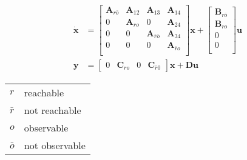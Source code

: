 \begin{align*}
    \dot{\mathbf{x}} & = \begin{bmatrix}
                             \mathbf{A}_{r\bar{o}} & \mathbf{A}_{12} & \mathbf{A}_{13}             & \mathbf{A}_{14}       \\
                             0                     & \mathbf{A}_{ro} & 0                           & \mathbf{A}_{24}       \\
                             0                     & 0               & \mathbf{A}_{\bar{r}\bar{o}} & \mathbf{A}_{34}       \\
                             0                     & 0               & 0                           & \mathbf{A}_{\bar{r}o} \\
                         \end{bmatrix}
    \mathbf{x} + \begin{bmatrix}
                     \mathbf{B}_{r\bar{o}} \\
                     \mathbf{B}_{ro}       \\
                     0                     \\
                     0                     \\
                 \end{bmatrix}
    \mathbf{u}                                                                                                         \\
    \mathbf{y}       & = \begin{bmatrix}
                             0 & \mathbf{C}_{ro} & 0 & \mathbf{C}_{\bar{r}0}
                         \end{bmatrix}\mathbf{x}
    + \mathbf{Du}
\end{align*}

\newpar{}

\begin{tabularx}{\linewidth}{@{}ll@{}}
    $r$       & reachable      \\
    $\bar{r}$ & not reachable  \\
    $o$       & observable     \\
    $\bar{o}$ & not observable \\
\end{tabularx}

